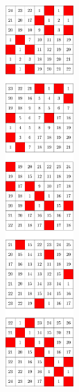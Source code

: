 \begin{figure}[H]
\centering
\includegraphics[width=0.23\textwidth]{figures/A/7x7x5_numbered_heatmap.pdf}
\caption{}
\label{fig:7x7x5_numbered_heatmap}
\end{figure}


